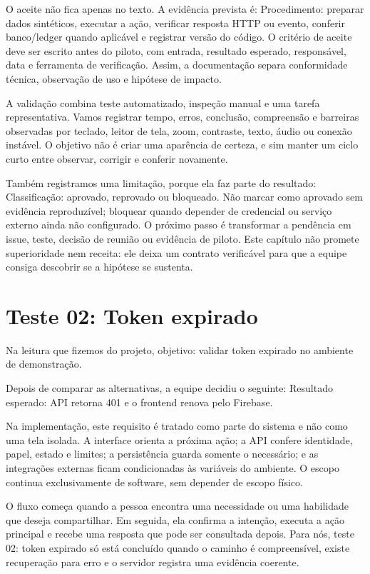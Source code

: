 \documentclass[12pt,oneside,a4paper,article]{abntex2}
\begin{document}
O aceite não fica apenas no texto. A evidência prevista é: Procedimento: preparar dados sintéticos, executar a ação, verificar resposta HTTP ou evento, conferir banco/ledger quando aplicável e registrar versão do código. O critério de aceite deve ser escrito antes do piloto, com entrada, resultado esperado, responsável, data e ferramenta de verificação. Assim, a documentação separa conformidade técnica, observação de uso e hipótese de impacto.

A validação combina teste automatizado, inspeção manual e uma tarefa representativa. Vamos registrar tempo, erros, conclusão, compreensão e barreiras observadas por teclado, leitor de tela, zoom, contraste, texto, áudio ou conexão instável. O objetivo não é criar uma aparência de certeza, e sim manter um ciclo curto entre observar, corrigir e conferir novamente.

Também registramos uma limitação, porque ela faz parte do resultado: Classificação: aprovado, reprovado ou bloqueado. Não marcar como aprovado sem evidência reproduzível; bloquear quando depender de credencial ou serviço externo ainda não configurado. O próximo passo é transformar a pendência em issue, teste, decisão de reunião ou evidência de piloto. Este capítulo não promete superioridade nem receita: ele deixa um contrato verificável para que a equipe consiga descobrir se a hipótese se sustenta.

\section{Teste 02: Token expirado}
Na leitura que fizemos do projeto, objetivo: validar token expirado no ambiente de demonstração.

Depois de comparar as alternativas, a equipe decidiu o seguinte: Resultado esperado: API retorna 401 e o frontend renova pelo Firebase.

Na implementação, este requisito é tratado como parte do sistema e não como uma tela isolada. A interface orienta a próxima ação; a API confere identidade, papel, estado e limites; a persistência guarda somente o necessário; e as integrações externas ficam condicionadas às variáveis do ambiente. O escopo continua exclusivamente de software, sem depender de escopo físico.

O fluxo começa quando a pessoa encontra uma necessidade ou uma habilidade que deseja compartilhar. Em seguida, ela confirma a intenção, executa a ação principal e recebe uma resposta que pode ser consultada depois. Para nós, teste 02: token expirado só está concluído quando o caminho é compreensível, existe recuperação para erro e o servidor registra uma evidência coerente.
\end{document}
